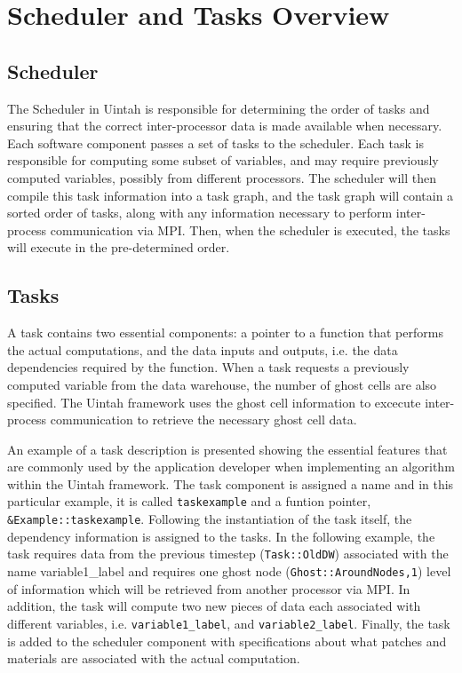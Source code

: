 \section{Scheduler and Tasks Overview}

\subsection{Scheduler}
The Scheduler in Uintah is responsible for determining the order of
tasks and ensuring that the correct inter-processor data is made
available when necessary. Each software component passes a set of
tasks to the scheduler. Each task is responsible for computing some
subset of variables, and may require previously computed variables,
possibly from different processors. The scheduler will then compile
this task information into a task graph, and the task graph will
contain a sorted order of tasks, along with any information necessary
to perform inter-process communication via MPI. Then, when the
scheduler is executed, the tasks will execute in the pre-determined
order.

\subsection{Tasks}

A task contains two essential components: a pointer to a function
that performs the actual computations, and the data inputs and
outputs, i.e. the data dependencies required by the function.  When a
task requests a previously computed variable from the data warehouse,
the number of ghost cells are also specified.  The Uintah framework
uses the ghost cell information to excecute inter-process
communication to retrieve the necessary ghost cell data.

An example of a task description is presented showing the essential
features that are commonly used by the application developer when
implementing an algorithm within the Uintah framework.  The task
component is assigned a name and in this particular example, it is
called \texttt{taskexample} and a funtion pointer,
\texttt{\&Example::taskexample}.  Following the instantiation of the
task itself, the dependency information is assigned to the tasks.  In
the following example, the task requires data from the previous
timestep (\texttt{Task::OldDW}) associated with the name
variable1\_label and requires one ghost node
(\texttt{Ghost::AroundNodes,1}) level of information which will be
retrieved from another processor via MPI.  In addition, the task will
compute two new pieces of data each associated with different
variables, i.e. \texttt{variable1\_label}, and
\texttt{variable2\_label}.  Finally, the task is added to the scheduler
component with specifications about what patches and materials are
associated with the actual computation.

